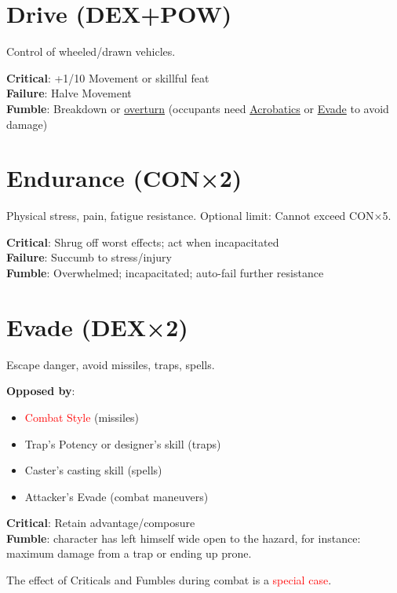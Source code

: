 \documentclass[10pt]{article}
\begin{document}
\section{Drive (DEX+POW)}
\label{skill:drive}

Control of wheeled/drawn vehicles.

\textbf{Critical}: +1/10 Movement or skillful feat\\
\textbf{Failure}: Halve Movement\\
\textbf{Fumble}: Breakdown or \hyperref[sec:falling]{overturn} (occupants need \hyperref[skill:acrobatics]{Acrobatics} or \hyperref[skill:evade]{Evade} to avoid damage)

\section{Endurance (CON×2)}
\label{skill:endurance}

Physical stress, pain, fatigue resistance. Optional limit: Cannot exceed CON×5.

\textbf{Critical}: Shrug off worst effects; act when incapacitated\\
\textbf{Failure}: Succumb to stress/injury\\
\textbf{Fumble}: Overwhelmed; incapacitated; auto-fail further resistance

\section{Evade (DEX×2)}
\label{skill:evade}

Escape danger, avoid missiles, traps, spells.

\textbf{Opposed by}:
\begin{itemize}
    \item \textcolor{red}{Combat Style} (missiles)
    \item Trap's Potency or designer's skill (traps)
    \item Caster's casting skill (spells)
    \item Attacker's Evade (combat maneuvers)
\end{itemize}

\textbf{Critical}: Retain advantage/composure\\
\textbf{Fumble}: character has left himself wide open to the hazard, for instance: maximum damage from a trap or ending up prone.

The effect of Criticals and Fumbles during combat is a \textcolor{red}{special case}.
\end{document}
